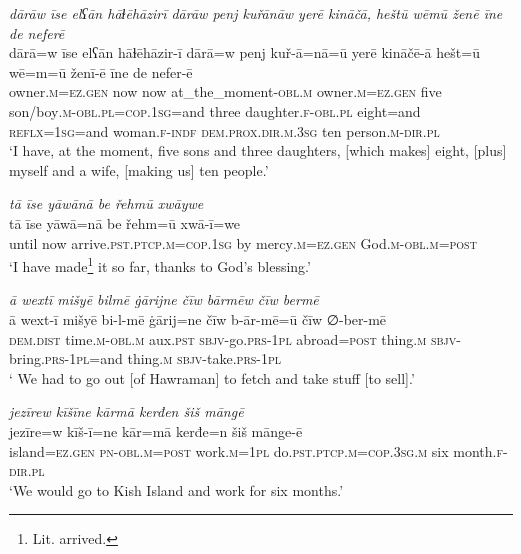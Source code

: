 \ea \label{ŽM.16}
\textit{dārāw īse elʕān hāɫēhāzirī dārāw penj kuřānāw yerē kināčā, heštū wēmū ženē īne de neferē} \\ 
\gll dārā=w īse elʕān hāɫēhāzir-ī dārā=w penj kuř-ā=nā=ū yerē kināčē-ā hešt=ū wē=m=ū ženī-ē īne de nefer-ē \\ 
 owner\textsc{.m}\textsc{=ez.gen} now now at\_the\_moment\textsc{-obl}\textsc{.m} owner\textsc{.m}\textsc{=ez.gen} five son/boy\textsc{.m}\textsc{-obl}\textsc{.pl}\textsc{=cop}\textsc{.\textsc{1sg}}=and three daughter\textsc{.f}\textsc{-obl}\textsc{.pl} eight=and \textsc{reflx}\textsc{=\textsc{1sg}}=and woman\textsc{.f}\textsc{-indf} \textsc{dem.prox}\textsc{.dir}\textsc{.m}\textsc{.3sg} ten person\textsc{.m}\textsc{-dir}\textsc{.pl} \\ 
\glt `I have, at the moment, five sons and three daughters, [which makes] eight, [plus] myself and a wife, [making us] ten people.'
\z 
 
\ea \label{ŽM.17}
\textit{tā īse yāwānā be řehmū xwāywe} \\ 
\gll tā īse yāwā=nā be řehm=ū xwā-ī=we \\ 
 until now arrive\textsc{.pst}\textsc{.ptcp}\textsc{.m}\textsc{=cop}\textsc{.\textsc{1sg}} by mercy\textsc{.m}\textsc{=ez.gen} God\textsc{.m}\textsc{-obl}\textsc{.m}\textsc{=\textsc{post}} \\ 
\glt `I have made\footnote{Lit. arrived.} it so far, thanks to God's blessing.'
\z 
 
\ea \label{ŽM.22}
\textit{ā wextī mišyē bilmē ġārijne čīw bārmēw čīw bermē} \\ 
\gll ā wext-ī mišyē bi-l-mē ġārij=ne čīw b-ār-mē=ū čīw ∅-ber-mē \\ 
 \textsc{dem.dist} time\textsc{.m}\textsc{-obl}\textsc{.m} aux\textsc{.pst} \textsc{sbjv-}go\textsc{.prs}\textsc{-\textsc{1pl}} abroad\textsc{=\textsc{post}} thing\textsc{.m} \textsc{sbjv-}bring\textsc{.prs}\textsc{-\textsc{1pl}}=and thing\textsc{.m} \textsc{sbjv-}take\textsc{.prs}\textsc{-\textsc{1pl}} \\ 
\glt ` We had to go out [of Hawraman] to fetch and take stuff [to sell].'
\z 
 
\ea \label{ŽM.25}
\textit{jezīrew kīšīne kārmā kerđen šiš māngē} \\ 
\gll jezīre=w kīš-ī=ne kār=mā kerđe=n šiš mānge-ē \\ 
 island\textsc{=ez.gen} \textsc{pn}\textsc{-obl}\textsc{.m}\textsc{=\textsc{post}} work\textsc{.m}\textsc{=\textsc{1pl}} do\textsc{.pst}\textsc{.ptcp}\textsc{.m}\textsc{=cop}\textsc{.3sg}\textsc{.m} six month\textsc{.f}\textsc{-dir}\textsc{.pl} \\ 
\glt `We would go to Kish Island and work for six months.'
\z 
 
